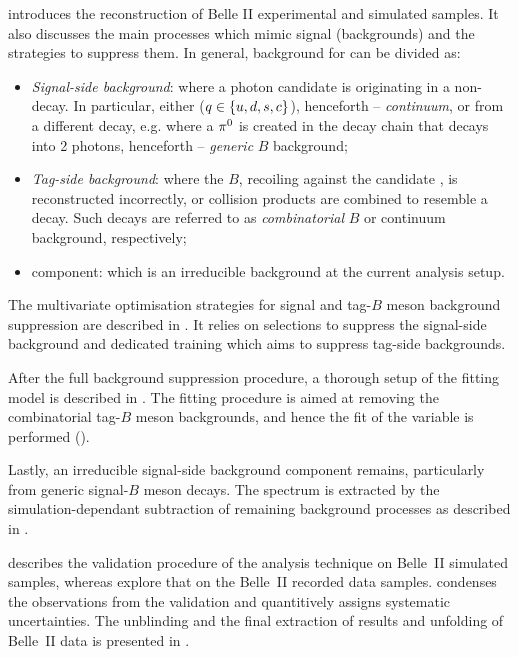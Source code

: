  introduces the reconstruction of Belle II experimental and simulated \BtoXsgamma samples.
It also discusses the main processes which mimic \BtoXsgamma signal (backgrounds) and the strategies to suppress them.
In general, background for \BtoXsgamma can be divided as:
\begin{itemize}
    \item \textit{Signal-side background}: where a photon candidate is originating in a non-\BtoXsgamma decay.
    In particular, either \epem\ra\qqbar ($q\in\{u,d,s,c\}$), henceforth -- \textit{continuum}, or from a different \B decay, e.g. where a $\pi^0$ is created in the decay chain that decays into 2 photons, henceforth -- \textit{generic} $B$ background;
    \item \textit{Tag-side background}: where the $B$, recoiling against the candidate \BtoXsgamma, is reconstructed incorrectly, or \epem\ra\qqbar collision products are combined to resemble a \B decay.
    Such decays are referred to as \textit{combinatorial} $B$ or continuum background, respectively;
    \item \BtoXdgamma component: which is an irreducible background at the current analysis setup. 
\end{itemize}

The
multivariate optimisation strategies for signal and tag-$B$ meson background suppression are described in 
.
It relies on selections to suppress the signal-side background and dedicated \BDT training which aims to suppress tag-side backgrounds.

After the full background suppression procedure, a thorough setup of the fitting model is described in .
The fitting procedure is aimed at removing the combinatorial tag-$B$ meson backgrounds, and hence the fit of the \Mbc variable is performed ().

Lastly, an irreducible signal-side background component remains, particularly from generic signal-$B$ meson decays.
The \EB spectrum is extracted by the simulation-dependant subtraction of remaining background processes as described in .

 describes the validation procedure of the analysis technique on Belle~II simulated samples,
whereas  explore that on the Belle~II recorded data samples.
 condenses the observations from the validation and quantitively assigns systematic uncertainties.
The unblinding and the final extraction of results and unfolding of Belle~II data is presented in .
